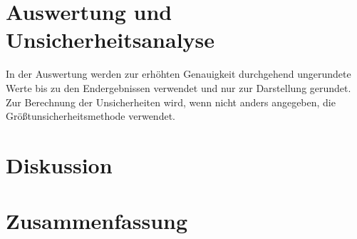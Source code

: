 \documentclass[12pt,a4paper,twoside]{article}
\begin{document}
\section{Auswertung und Unsicherheitsanalyse} %

In der Auswertung werden zur erhöhten Genauigkeit durchgehend ungerundete Werte bis zu den Endergebnissen verwendet und nur zur Darstellung gerundet. \\
Zur Berechnung der Unsicherheiten wird, wenn nicht anders angegeben, die Größtunsicherheitsmethode verwendet.


\section{Diskussion} %


\section{Zusammenfassung} %


\printbibliography[heading=bibintoc]
\end{document}
